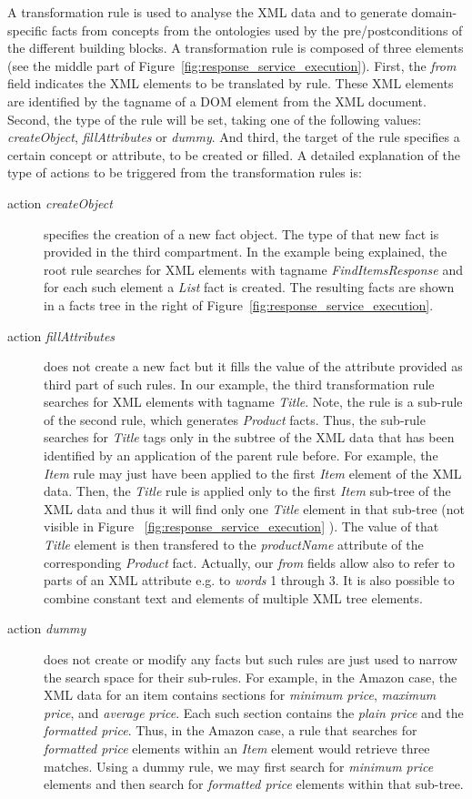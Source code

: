 \documentclass{fast_latex}
\begin{document}
A transformation rule is used to analyse the XML data and to generate domain-specific facts from concepts from the ontologies used by the pre/postconditions of the different building blocks. A transformation rule is composed of three elements (see the middle part of Figure~\ref{fig:response_service_execution}). First, the \textit{from} field indicates the XML elements to be translated by rule. These XML elements are identified by the tagname of a DOM element from the XML document. Second, the type of the rule will be set, taking one of the following values: \emph{createObject}, \emph{fillAttributes} or \emph{dummy}. And third, the target of the rule specifies a certain concept or attribute, to be created or filled. A detailed explanation of the type of actions to be triggered from the transformation rules is:

\begin{description}
	\item[action \emph{createObject}] specifies the creation of a new fact object. The type of that new fact is provided in the third compartment. In the example being explained, the root rule searches for XML elements with tagname \emph{FindItemsResponse} and for each such element a \emph{List} fact is created. The resulting facts are shown in a facts tree in the right of Figure~\ref{fig:response_service_execution}.
	\item[action \emph{fillAttributes}] does not create a new fact but it fills the value of the attribute provided as third part of such rules. In our example, the third transformation rule searches for XML elements with tagname \emph{Title}. Note, the rule is a sub-rule of the second rule, which generates \emph{Product} facts. Thus, the sub-rule searches for \emph{Title} tags only in the subtree of the XML data that has been identified by an application of the parent rule before. For example, the \emph{Item} rule may just have been applied to the first \emph{Item} element of the XML data. Then, the \emph{Title} rule is applied only to the first \emph{Item} sub-tree of the XML data and thus it will find only one \emph{Title} element in that sub-tree (not visible in Figure ~\ref{fig:response_service_execution} ). The value of that \emph{Title} element is then transfered to the \emph{productName} attribute of the corresponding \emph{Product} fact. Actually, our \textit{from} fields allow also to refer to parts of an XML attribute e.g. to \textit{words} 1 through 3. It is also possible to combine constant text and elements of multiple XML tree elements. 
	\item[action \emph{dummy}] does not create or modify any facts but such rules are just used to narrow the search space for their sub-rules. For example, in the Amazon case, the XML data for an item contains sections for \emph{minimum price}, \emph{maximum price}, and \emph{average price}. Each such section contains the \emph{plain price} and the \emph{formatted price}. Thus, in the Amazon case, a rule that searches for \emph{formatted price} elements within an \emph{Item} element would retrieve three matches. Using a dummy rule, we may first search for \emph{minimum price} elements and then search for \emph{formatted price} elements within that sub-tree.
\end{description}
\end{document}
